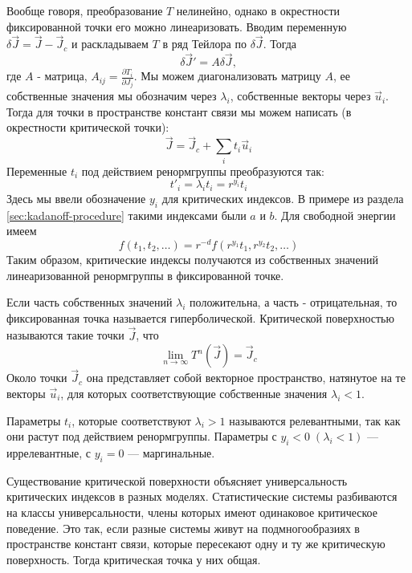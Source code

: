 \documentclass[a4paper,12pt]{article}
\theoremstyle{definition}
\theoremstyle{definition}
\theoremstyle{definition}
\begin{document}
Вообще говоря, преобразование $T$ нелинейно, однако в окрестности фиксированной точки его можно линеаризовать. Вводим переменную $\delta\vec J=\vec J-\vec J_c$ и раскладываем $T$ в ряд Тейлора по $\delta\vec J$. Тогда
\begin{equation}
  \label{eq:59}
  \delta\vec J'=A\delta\vec J,
\end{equation}
где $A$ - матрица, $A_{ij}=\frac{\partial T_i}{\partial J_j}$. Мы можем диагонализовать матрицу $A$, ее собственные значения мы обозначим через $\lambda_i$, собственные векторы через $\vec u_i$. Тогда для точки в пространстве констант связи мы можем написать (в окрестности  критической точки):
\begin{equation}
  \label{eq:60}
  \vec J=\vec J_c+\sum_i t_i \vec u_i
\end{equation}
Переменные $t_i$ под действием ренормгруппы преобразуются так:
\begin{equation}
  \label{eq:61}
  t'_i=\lambda_i t_i=r^{y_i} t_i
\end{equation}
Здесь мы ввели обозначение $y_i$ для критических индексов. В примере из раздела \ref{sec:kadanoff-procedure} такими индексами были $a$ и $b$. 
Для свободной энергии имеем
\begin{equation}
  \label{eq:62}
  f(t_1,t_2,\dots)=r^{-d} f(r^{y_1}t_1,r^{y_2}t_2,\dots)
\end{equation}
Таким образом, критические индексы получаются из собственных значений линеаризованной ренормгруппы в фиксированной точке.

Если часть собственных значений $\lambda_i$ положительна, а часть - отрицательная, то фиксированная точка называется гиперболической. 
Критической поверхностью называются такие точки $\vec J$, что
\begin{equation}
  \label{eq:63}
  \lim_{n\to \infty}T^n (\vec J)=\vec J_c
\end{equation}
Около точки $\vec J_c$ она представляет собой векторное пространство, натянутое на те векторы $\vec u_i$, для которых соответствующие собственные значения $\lambda_i<1$. 

Параметры $t_i$, которые соответствуют $\lambda_i>1$ называются релевантными, так как они растут под действием ренормгруппы. Параметры с $y_i<0 \; (\lambda_i<1)$ --- иррелевантные, с $y_i=0$ --- маргинальные.

Существование критической поверхности объясняет универсальность критических индексов в разных моделях. Статистические системы разбиваются на классы универсальности, члены которых имеют одинаковое критическое поведение. Это так, если разные системы живут на подмногообразиях в пространстве констант связи, которые пересекают одну и ту же критическую поверхность. Тогда критическая точка у них общая.
\end{document}

